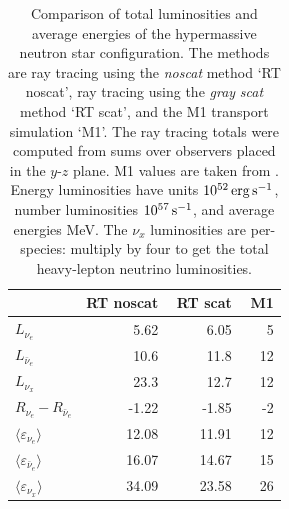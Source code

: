 \documentclass[aps,floatfix,prd,superscriptaddress,twocolumn]{revtex4-1}
\begin{document}
\begin{table}%
  \caption{
    Comparison of total luminosities and average energies
    of the hypermassive neutron star configuration.
    The methods are ray tracing using the \emph{noscat} method `RT noscat',
    ray tracing using the \emph{gray} \emph{scat} method `RT scat',
    and the M1 transport simulation `M1'.
    The ray tracing totals were computed from sums over
    observers placed in the $y$-$z$ plane.
    M1 values are taken from \cite[Figs. 7, 9, 10]{fouc2016-m1_evolve_n}.
    Energy luminosities have units $10^{52}\,{\rm erg}\,{\rm s}^{-1}$,
    number luminosities $10^{57}\,{\rm s}^{-1}$, and
    average energies MeV.
    The $\nu_x$ luminosities are per-species:
    multiply by four to get the total heavy-lepton neutrino luminosities.
  }
  \label{tab:nsns_rt_vs_m1}
  \begin{tabularx}{\columnwidth}{X r r r}
    & {\bf RT noscat} & \,\,{\bf RT scat} & \,\,{\bf M1} \\
    \hline
    $L_{\nu_e}$                                 & 5.62 & 6.05 & 5 \\
    $L_{\bar{\nu}_e}$                           & 10.6 & 11.8 & 12 \\
    $L_{\nu_x}$                                 & 23.3 & 12.7 & 12 \\
    $R_{\nu_e}-R_{\bar{\nu}_e}$                 & -1.22 & -1.85 & -2 \\
    $\langle \varepsilon_{\nu_e} \rangle$       & 12.08 & 11.91 & 12 \\
    $\langle \varepsilon_{\bar{\nu}_e} \rangle$ & 16.07 & 14.67 & 15 \\
    $\langle \varepsilon_{\nu_x} \rangle$       & 34.09 & 23.58 & 26 \\
    \hline
  \end{tabularx}
\end{table}
\end{document}
